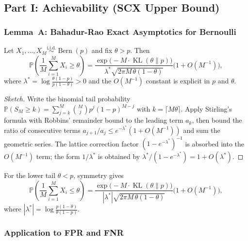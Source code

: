 \subsection{Part I: Achievability (SCX Upper Bound)}
\label{sec:thm4_upper}

\subsubsection{Lemma~A: Bahadur-Rao Exact Asymptotics for Bernoulli}
\label{sec:lemmaA}

\begin{lemma}
  \label{lem:BahadurRao}
  Let $X_1,\dots,X_M\stackrel{\text{i.i.d.}}{\sim}\operatorname{Bern}(p)$ and
  fix $\theta>p$.  Then
  \[
  \mathbb{P}\!\left(\frac1M\sum_{i=1}^M X_i \ge \theta\right)
  = \frac{\exp\!\bigl(-M\cdot\operatorname{KL}(\theta\|p)\bigr)}
         {\lambda^*\sqrt{2\pi M\,\theta(1-\theta)}}
    \bigl(1+O(M^{-1})\bigr),
  \]
  where $\lambda^*=\log\frac{\theta(1-p)}{p(1-\theta)}>0$ and the $O(M^{-1})$
  constant is explicit in $p$ and $\theta$.
\end{lemma}

\begin{proof}[Sketch]
  Write the binomial tail probability
  $\mathbb{P}(S_M\ge k)=\sum_{j=k}^M\binom{M}{j}p^j(1-p)^{M-j}$ with
  $k=\lceil M\theta\rceil$.  Apply Stirling's formula with Robbins' remainder
  bound to the leading term $a_k$, then bound the ratio of consecutive terms
  $a_{j+1}/a_j\le e^{-\lambda^*}(1+O(M^{-1}))$ and sum the geometric series.
  The lattice correction factor $(1-e^{-\lambda^*})^{-1}$ is absorbed into
  the $O(M^{-1})$ term; the form $1/\lambda^*$ is obtained by
  $\lambda^*/(1-e^{-\lambda^*})=1+O(\lambda^*)$.
\end{proof}

For the lower tail $\theta<p$, symmetry gives
\[
\mathbb{P}\!\left(\frac1M\sum_{i=1}^M X_i \le \theta\right)
= \frac{\exp\!\bigl(-M\cdot\operatorname{KL}(\theta\|p)\bigr)}
       {|\lambda^*|\sqrt{2\pi M\,\theta(1-\theta)}}
  \bigl(1+O(M^{-1})\bigr),
\]
where $|\lambda^*|=\log\frac{p(1-\theta)}{\theta(1-p)}$.

\subsubsection{Application to FPR and FNR}

